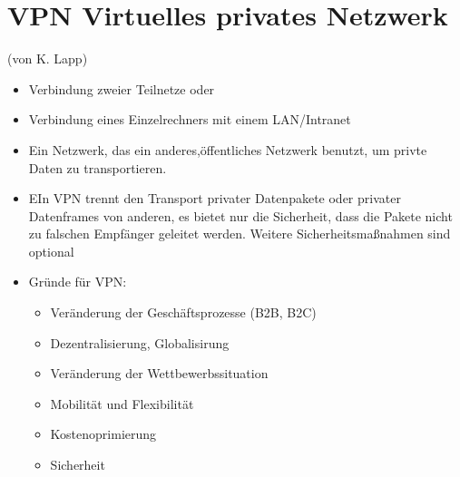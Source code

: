 \section*{VPN Virtuelles privates Netzwerk}
(von K. Lapp)\\

\cite[S. 372-378]{zisler2018computer}
\begin{itemize}
  \item Verbindung zweier Teilnetze oder
  \item Verbindung eines Einzelrechners mit einem LAN/Intranet
\end{itemize}

\cite{lipp2007vpn}
\begin{itemize}
  \item Ein Netzwerk, das ein anderes,öffentliches Netzwerk benutzt, um privte Daten zu transportieren. 
  \item EIn VPN trennt den Transport privater Datenpakete oder privater Datenframes von anderen, es bietet nur die Sicherheit, dass die Pakete nicht zu falschen Empfänger geleitet werden. Weitere Sicherheitsmaßnahmen sind optional
  \item Gründe für VPN: \begin{itemize}
  						\item Veränderung der Geschäftsprozesse (B2B, B2C)
  						\item Dezentralisierung, Globalisirung
  						\item Veränderung der Wettbewerbssituation
  						\item Mobilität und Flexibilität
  						\item Kostenoprimierung
  						\item Sicherheit
						\end{itemize}
						

\end{itemize}
